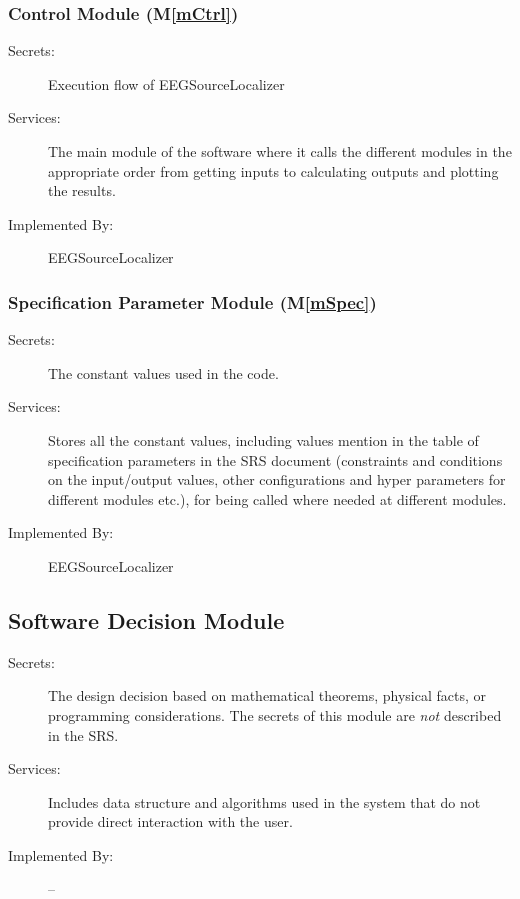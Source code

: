 \documentclass[12pt, titlepage]{article}
\newcommand{\mref}[1]{M\ref{#1}}
\renewcommand{\progname}{EEGSourceLocalizer}
\begin{document}
\subsubsection{Control Module (\mref{mCtrl})}

\begin{description}
\item[Secrets:]Execution flow of \progname{}
\item[Services:] The main module of the software where it calls the different modules in the appropriate order from getting inputs to calculating outputs and plotting the results.
\item[Implemented By:] \progname{}
\end{description}

\subsubsection{Specification Parameter Module (\mref{mSpec})}

\begin{description}
\item[Secrets:] The constant values used in the code.
\item[Services:] Stores all the constant values, including values mention in the table of specification parameters in the SRS document (constraints and conditions on the input/output values, other configurations and hyper parameters for different modules etc.), for being called where needed at different modules.
\item[Implemented By:] \progname{}
\end{description}


\subsection{Software Decision Module}

\begin{description}
\item[Secrets:] The design decision based on mathematical theorems, physical
  facts, or programming considerations. The secrets of this module are
  \emph{not} described in the SRS.
\item[Services:] Includes data structure and algorithms used in the system that
  do not provide direct interaction with the user. 
\item[Implemented By:] --
\end{description}
\end{document}
